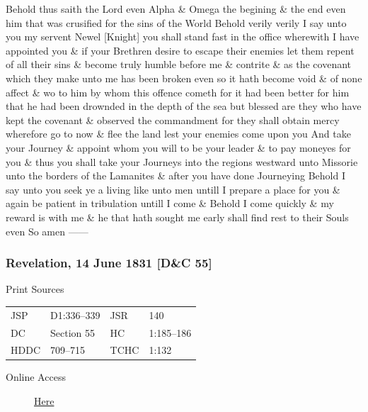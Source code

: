 				Behold thus saith the Lord even Alpha \& Omega the begining \& the end even him that was crusified for the sins of the World Behold verily verily I say unto you my servent Newel [Knight] you shall stand fast in the office wherewith I have appointed you \& if your Brethren desire to escape their enemies let them repent of all their sins \& become truly humble before me \& contrite \& as the covenant which they make unto me has been broken even so it hath become void \& of none affect \& wo to him by whom this offence cometh for it had been better for him that he had been drownded in the depth of the sea but blessed are they who have kept the covenant \& observed the commandment for they shall obtain mercy wherefore go to now \& flee the land lest your enemies come upon you And take your Journey \& appoint whom you will to be your leader \& to pay moneyes for you \& thus you shall take your Journeys into the regions westward unto Missorie unto the borders of the Lamanites \& after you have done Journeying Behold I say unto you seek ye a living like unto men untill I prepare a place for you \& again be patient in tribulation untill I come \& Behold I come quickly \& my reward is with me \& he that hath sought me early shall find rest to their Souls even So amen ------
				
		\subsubsection{Revelation, 14 June 1831 [D\&C 55]}
			\label{EMS-1831-JS-14-JUN-1831}
		
			\begin{description}
				\item[Print Sources]
			\end{description}

				\begin{tabular}{p{0.5in}p{1in}p{0.5in}p{1in}}
				JSP	 	& D1:336--339	& JSR 		& 140 \\
				DC	 	& Section 55 	& HC 		& 1:185--186 \\
				HDDC 	& 709--715		& TCHC 		& 1:132	 \\
				\end{tabular}
			
			\begin{description}
				\item[Online Access] \href{https://www.josephsmithpapers.org/paper-summary/revelation-14-june-1831-dc-55/1}{Here}
			\end{description}
			
